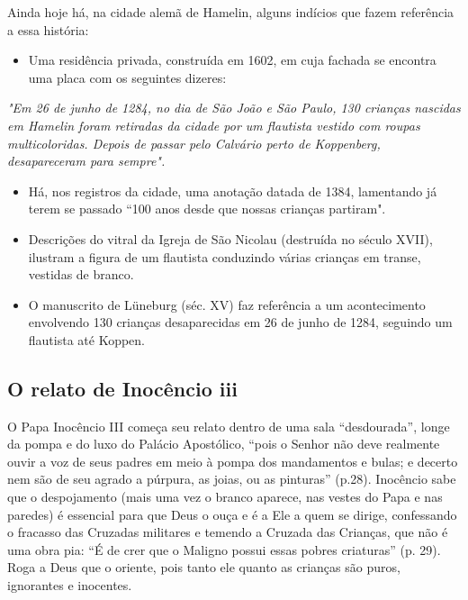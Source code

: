 \documentclass[12pt]{extarticle}
\begin{document}
Ainda hoje há, na cidade alemã de Hamelin, alguns indícios que fazem
referência a essa história:

\begin{itemize}
\item
  Uma residência privada, construída em 1602, em cuja fachada se
  encontra uma placa com os seguintes dizeres:
\end{itemize}

\emph{"Em 26 de junho de 1284, no dia de São João e São Paulo, 130
crianças nascidas em Hamelin foram retiradas da cidade por um flautista
vestido com roupas multicoloridas. Depois de passar pelo Calvário perto
de Koppenberg, desapareceram para sempre".}



\begin{itemize}
\item
  Há, nos registros da cidade, uma anotação datada de 1384, lamentando
  já terem se passado ``100 anos desde que nossas crianças partiram".
\end{itemize}

\begin{quote}

\end{quote}

\begin{itemize}
\item
  Descrições do vitral da Igreja de São Nicolau (destruída no século
  XVII), ilustram a figura de um flautista conduzindo várias crianças em
  transe, vestidas de branco.
\end{itemize}

\begin{itemize}
\item
  O manuscrito de Lüneburg (séc. XV) faz referência a um acontecimento
  envolvendo 130 crianças desaparecidas em 26 de junho de 1284, seguindo
  um flautista até Koppen.
\end{itemize}

\subsection{O relato de Inocêncio iii}

O Papa Inocêncio III começa seu relato dentro de uma sala
``desdourada'', longe da pompa e do luxo do Palácio Apostólico, ``pois o
Senhor não deve realmente ouvir a voz de seus padres em meio à pompa dos
mandamentos e bulas; e decerto nem são de seu agrado a púrpura, as
joias, ou as pinturas'' (p.28). Inocêncio sabe que o despojamento (mais
uma vez o branco aparece, nas vestes do Papa e nas paredes) é essencial
para que Deus o ouça e é a Ele a quem se dirige, confessando o fracasso
das Cruzadas militares e temendo a Cruzada das Crianças, que não é uma
obra pia: ``É de crer que o Maligno possui essas pobres criaturas'' (p.
29). Roga a Deus que o oriente, pois tanto ele quanto as crianças são
puros, ignorantes e inocentes.
\end{document}
